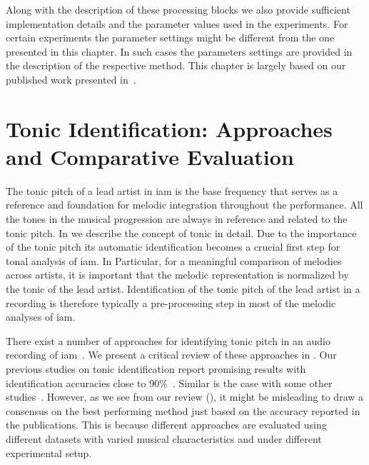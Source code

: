 Along with the description of these processing blocks we also provide sufficient implementation details and the parameter values used in the experiments. For certain experiments the parameter settings might be different from the one presented in this chapter. In such cases the parameters settings are provided in the description of the respective method. This chapter is largely based on our published work presented in~\cite{Gulati2014Tonic,gulati2014Landmark,gulati_SITIS_2014}.


\section{Tonic Identification: Approaches and Comparative Evaluation}
\label{sec:data_preprocessing_tonic_identification}

The tonic pitch of a lead artist in \gls{iam} is the base frequency that serves as a reference and foundation for melodic integration throughout the performance. All the tones in the musical progression are always in reference and related to the tonic pitch. In  we describe the concept of tonic in detail. Due to the importance of the tonic pitch its automatic identification becomes a crucial first step for tonal analysis of \gls{iam}. In Particular, for a meaningful comparison of melodies across artists, it is important that the melodic representation is normalized by the tonic of the lead artist. Identification of the tonic pitch of the lead artist in a recording is therefore typically a pre-processing step in most of the melodic analyses of \gls{iam}. 

There exist a number of approaches for identifying tonic pitch in an audio recording of \gls{iam}~\citep{salamon2012multipitch,gulati2012two,bellur2012knowledge,ranjani2011carnatic,Sengupta2005b,chordia2013joint}. We present a critical review of these approaches in . Our previous studies on tonic identification report promising results with identification accuracies close to 90\%~\citep{salamon2012multipitch,gulati2012two}. Similar is the case with some other studies~\citep{ranjani2011carnatic}. However, as we see from our review (), it might be misleading to draw a consensus on the best performing method just based on the accuracy reported in the publications. This is because different approaches are evaluated using different datasets with varied musical characteristics and under different experimental setup. 


